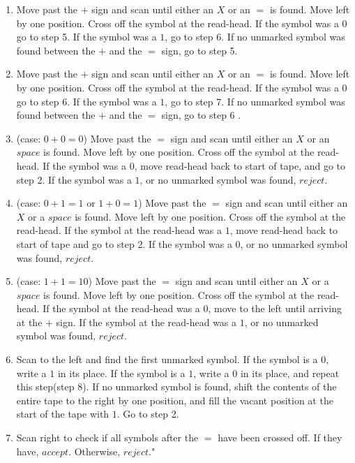 \documentclass{article}
\begin{document}
\begin{enumerate}[\indent a)]
\begin{enumerate}[\indent 1.]
		
		\item Move past the $+$ sign and scan until either an $X$ or an $=$ is found. Move left by one position. Cross off the symbol at the read-head. If the symbol was a $0$ go to step 5. If the symbol was a $1$, go to step 6. If no unmarked symbol was found between the $+$ and the $=$ sign, go to step 5.
		\item Move past the $+$ sign and scan until either an $X$ or an $=$ is found. Move left by one position. Cross off the symbol at the read-head. If the symbol was a $0$ go to step 6. If the symbol was a $1$, go to step 7. If no unmarked symbol was found between the $+$ and the $=$ sign, go to step 6 .
		
		\item (case: $0 + 0 = 0$) Move past the $=$ sign and scan until either an $X$ or an $space$ is found. Move left by one position. Cross off the symbol at the read-head. If the symbol was a $0$, move read-head back to start of tape, and go to step 2. If the symbol was a $1$, or no unmarked symbol was found, $reject$.
		
		\item (case: $0 + 1 = 1$ or $1 + 0 = 1$) Move past the $=$ sign and scan until either an $X$ or a $space$ is found. Move left by one position. Cross off the symbol at the read-head. If the symbol at the read-head was a $1$, move read-head back to start of tape and go to step 2. If the symbol was a $0$, or no unmarked symbol was found, $reject$.
		
		\item (case: $1 + 1 = 10$) Move past the $=$ sign and scan until either an $X$ or a $space$ is found. Move left by one position. Cross off the symbol at the read-head. If the symbol at the read-head was a $0$, move to the left until arriving at the $+$ sign. If the symbol at the read-head was a $1$, or no unmarked symbol was found, $reject$.
		
		\item Scan to the left and find the first unmarked symbol. If the symbol is a $0$, write a $1$ in its place. If the symbol is a $1$, write a $0$ in its place, and repeat this step(step 8). If no unmarked symbol is found, shift the contents of the entire tape to the right by one position, and fill the vacant position at the start of the tape with $1$. Go to step 2.
		
		\item Scan right to check if all symbols after the $=$ have been crossed off. If they have, $accept$. Otherwise, $reject$."
		 		
    \end{enumerate}

\newpage

\end{enumerate}
\end{document}
